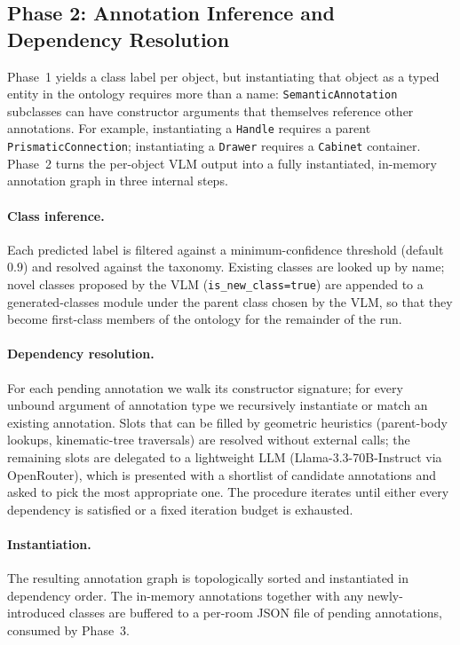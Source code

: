 \documentclass[conference]{IEEEtran}
\begin{document}
\subsection{Phase 2: Annotation Inference and Dependency Resolution}
\label{sec:refine}

Phase~1 yields a class label per object, but instantiating that object
as a typed entity in the ontology requires more than a name:
\texttt{SemanticAnnotation} subclasses can have constructor arguments
that themselves reference other annotations. For example,
instantiating a \texttt{Handle} requires a parent
\texttt{PrismaticConnection}; instantiating a \texttt{Drawer} requires
a \texttt{Cabinet} container. Phase~2 turns the per-object VLM output
into a fully instantiated, in-memory annotation graph in three
internal steps.

\paragraph{Class inference.} Each predicted label is filtered against
a minimum-confidence threshold (default $0.9$) and resolved against
the taxonomy. Existing classes are looked up by name; novel classes
proposed by the VLM (\texttt{is\_new\_class{=}true}) are appended to a
generated-classes module under the parent class chosen by the VLM, so
that they become first-class members of the ontology for the remainder
of the run.

\paragraph{Dependency resolution.} For each pending annotation we walk
its constructor signature; for every unbound argument of annotation
type we recursively instantiate or match an existing annotation. Slots
that can be filled by geometric heuristics (parent-body lookups,
kinematic-tree traversals) are resolved without external calls; the
remaining slots are delegated to a lightweight LLM
(Llama-3.3-70B-Instruct via OpenRouter), which is presented with a
shortlist of candidate annotations and asked to pick the most
appropriate one. The procedure iterates until either every dependency
is satisfied or a fixed iteration budget is exhausted.

\paragraph{Instantiation.} The resulting annotation graph is
topologically sorted and instantiated in dependency order. The
in-memory annotations together with any newly-introduced classes are
buffered to a per-room JSON file of pending annotations, consumed by
Phase~3.
\end{document}

